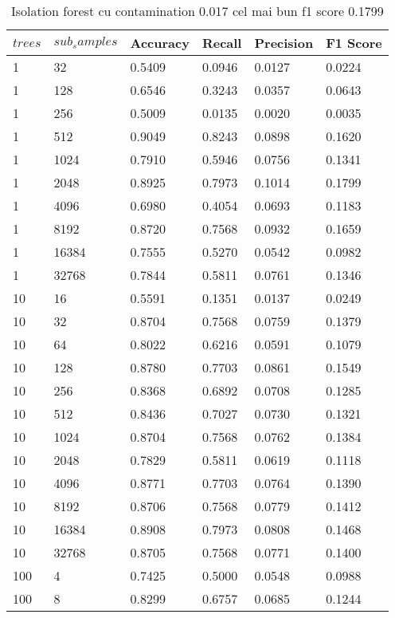 \begin{table}[H]
    \caption{Isolation forest cu contamination 0.017 cel mai bun f1 score 0.1799}
    \centering
    \begin{tabularx}{\textwidth}{
        |X
        |X
        |X
        |X
        |X
        |X|
    }
    \hline
    $trees$ & $sub_samples$ & {Accuracy} & {Recall} & {Precision} & {F1 Score} \\
    \hline
    1 & 32 & 0.5409 & 0.0946 & 0.0127 & 0.0224 \\
    1 & 128 & 0.6546 & 0.3243 & 0.0357 & 0.0643 \\
    1 & 256 & 0.5009 & 0.0135 & 0.0020 & 0.0035 \\
    1 & 512 & 0.9049 & 0.8243 & 0.0898 & 0.1620 \\
    1 & 1024 & 0.7910 & 0.5946 & 0.0756 & 0.1341 \\
    1 & 2048 & 0.8925 & 0.7973 & 0.1014 & 0.1799 \\
    1 & 4096 & 0.6980 & 0.4054 & 0.0693 & 0.1183 \\
    1 & 8192 & 0.8720 & 0.7568 & 0.0932 & 0.1659 \\
    1 & 16384 & 0.7555 & 0.5270 & 0.0542 & 0.0982 \\
    1 & 32768 & 0.7844 & 0.5811 & 0.0761 & 0.1346 \\
    10 & 16 & 0.5591 & 0.1351 & 0.0137 & 0.0249 \\
    10 & 32 & 0.8704 & 0.7568 & 0.0759 & 0.1379 \\
    10 & 64 & 0.8022 & 0.6216 & 0.0591 & 0.1079 \\
    10 & 128 & 0.8780 & 0.7703 & 0.0861 & 0.1549 \\
    10 & 256 & 0.8368 & 0.6892 & 0.0708 & 0.1285 \\
    10 & 512 & 0.8436 & 0.7027 & 0.0730 & 0.1321 \\
    10 & 1024 & 0.8704 & 0.7568 & 0.0762 & 0.1384 \\
    10 & 2048 & 0.7829 & 0.5811 & 0.0619 & 0.1118 \\
    10 & 4096 & 0.8771 & 0.7703 & 0.0764 & 0.1390 \\
    10 & 8192 & 0.8706 & 0.7568 & 0.0779 & 0.1412 \\
    10 & 16384 & 0.8908 & 0.7973 & 0.0808 & 0.1468 \\
    10 & 32768 & 0.8705 & 0.7568 & 0.0771 & 0.1400 \\
    100 & 4 & 0.7425 & 0.5000 & 0.0548 & 0.0988 \\
    100 & 8 & 0.8299 & 0.6757 & 0.0685 & 0.1244 \\

\end{tabularx}
\end{table}
